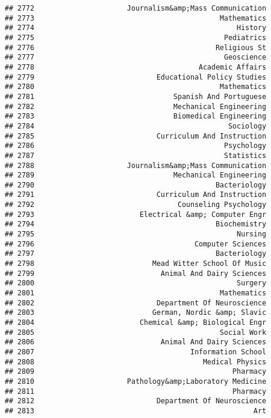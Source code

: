 \documentclass[
]{article}
\begin{document}
\begin{verbatim}
## 2772                      Journalism&amp;Mass Communication
## 2773                                            Mathematics
## 2774                                                History
## 2775                                             Pediatrics
## 2776                                           Religious St
## 2777                                             Geoscience
## 2778                                       Academic Affairs
## 2779                             Educational Policy Studies
## 2780                                            Mathematics
## 2781                                 Spanish And Portuguese
## 2782                                 Mechanical Engineering
## 2783                                 Biomedical Engineering
## 2784                                              Sociology
## 2785                             Curriculum And Instruction
## 2786                                             Psychology
## 2787                                             Statistics
## 2788                      Journalism&amp;Mass Communication
## 2789                                 Mechanical Engineering
## 2790                                           Bacteriology
## 2791                             Curriculum And Instruction
## 2792                                  Counseling Psychology
## 2793                         Electrical &amp; Computer Engr
## 2794                                           Biochemistry
## 2795                                                Nursing
## 2796                                      Computer Sciences
## 2797                                           Bacteriology
## 2798                            Mead Witter School Of Music
## 2799                              Animal And Dairy Sciences
## 2800                                                Surgery
## 2801                                            Mathematics
## 2802                             Department Of Neuroscience
## 2803                            German, Nordic &amp; Slavic
## 2804                         Chemical &amp; Biological Engr
## 2805                                            Social Work
## 2806                              Animal And Dairy Sciences
## 2807                                     Information School
## 2808                                        Medical Physics
## 2809                                               Pharmacy
## 2810                      Pathology&amp;Laboratory Medicine
## 2811                                               Pharmacy
## 2812                             Department Of Neuroscience
## 2813                                                    Art

\end{verbatim}
\end{document}
